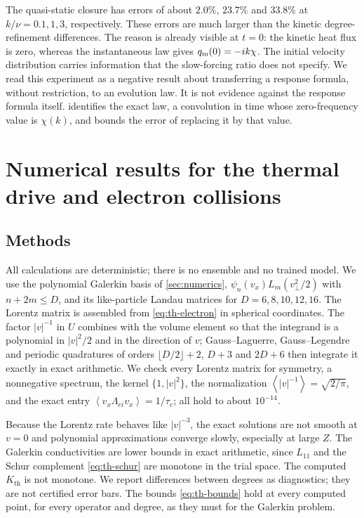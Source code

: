\documentclass[11pt]{article}
\newcommand{\av}[1]{\left\langle #1\right\rangle}
\newcommand{\thr}{\mathrm{th}}
\theoremstyle{definition}
\theoremstyle{remark}
\numberwithin{equation}{section}
\begin{document}
The quasi-static closure has errors of about $2.0\%$, $23.7\%$ and
$33.8\%$ at $k/\nu=0.1,1,3$, respectively.
These errors are much larger than the kinetic degree-refinement
differences. The reason is already visible at $t=0$: the kinetic heat
flux is zero, whereas the instantaneous law gives
$q_{\rm m}(0)=-ik\chi$. The initial velocity distribution carries
information that the slow-forcing ratio does not specify. We read this
experiment as a negative result about transferring a response formula,
without restriction, to an evolution law. It is not evidence against the
response formula itself.  identifies the exact law, a
convolution in time whose zero-frequency value is $\chi(k)$, and bounds
the error of replacing it by that value.

\FloatBarrier
\section{Numerical results for the thermal drive and electron collisions}\label{sec:th-numerics}

\subsection{Methods}

All calculations are deterministic; there is no ensemble and no trained
model. We use the polynomial Galerkin basis of \cref{sec:numerics},
$\psi_n(v_x)L_m(v_\perp^2/2)$ with $n+2m\leq D$, and its like-particle
Landau matrices for $D=6,8,10,12,16$. The Lorentz matrix is assembled
from \eqref{eq:th-electron} in spherical coordinates. The factor $|v|^{-1}$
in $U$ combines with the volume element so that the integrand is a
polynomial in $|v|^2/2$ and in the direction of $v$; Gauss--Laguerre,
Gauss--Legendre and periodic quadratures of orders
$\lfloor D/2\rfloor+2$, $D+3$ and $2D+6$ then integrate it exactly in
exact arithmetic. We check every Lorentz matrix for symmetry, a
nonnegative spectrum, the kernel $\{1,|v|^2\}$, the normalization
$\av{|v|^{-1}}=\sqrt{2/\pi}$, and the exact entry
$\av{v_x\Lambda_{ei}v_x}=1/\tau_e$; all hold to about $10^{-14}$.

Because the Lorentz rate behaves like $|v|^{-3}$, the exact solutions are
not smooth at $v=0$ and polynomial approximations converge slowly,
especially at large $Z$. The Galerkin conductivities are lower bounds in
exact arithmetic, since $L_{11}$ and the Schur complement \eqref{eq:th-schur}
are monotone in the trial space. The computed $K_\thr$ is not monotone. We
report differences between degrees as diagnostics; they are not
certified error bars. The bounds \eqref{eq:th-bounds} hold at every computed
point, for every operator and degree, as they must for the Galerkin
problem.
\end{document}
